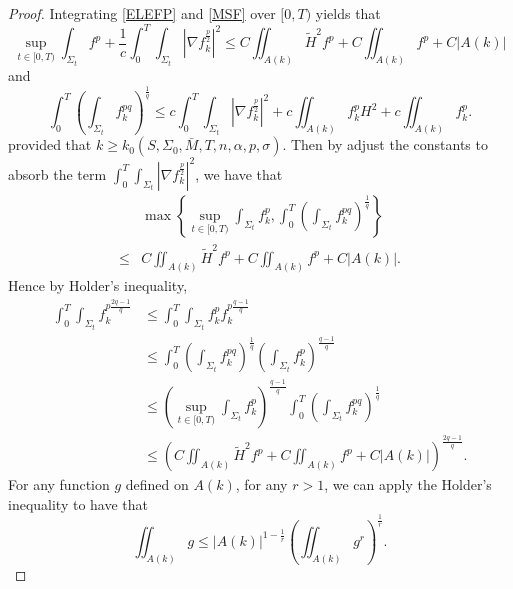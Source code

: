 \begin{proof}
    Integrating \autoref{ELEFP} and \autoref{MSF} over $[0,T)$ yields that 
    \begin{equation*}
        \sup _{t \in [0,T)} \int_{\Sigma_t} f^p + \frac{1}{c} \int_{0}^{T}\int_{\Sigma_t} \left| \nabla f_{k}^{\frac{p}{2}}  \right| ^2 \leq C \iint_{A(k)}^{} \tilde{H}^2 f^p +C \iint_{A(k)}^{}f^p + C \left| A(k) \right| 
    \end{equation*}
    and
    \begin{equation*}
        \int_{0}^{T} \left(\int_{\Sigma_t} f_{k}^{pq} \right) ^{\frac{1}{q}} \leq c \int_{0}^{T}\int_{\Sigma_t} \left| \nabla f_{k}^{\frac{p}{2}} \right| ^2 + c \iint_{A(k)} f_{k}^{p} H^2 + c \iint_{A(k)} f_{k}^{p}.
    \end{equation*}
    provided that $k \geq k_0(S,\Sigma _0,\bar{M},T,n,\alpha ,p,\sigma ).$ 
    Then by adjust the constants to absorb the term $\int_{0}^{T}\int_{\Sigma_t} \left| \nabla f_{k}^{\frac{p}{2}} \right| ^2$, we have that
    \begin{equation*}
    \begin{split}
        &\max \left\{ \sup _{t \in [0,T)} \int_{\Sigma_t} f_{k}^{p}, \int_{0}^{T} \left(\int_{\Sigma_t} f_{k}^{pq} \right) ^{\frac{1}{q}}  \right\} \\
        \leq &C \iint_{A(k)}^{} \tilde{H}^2 f^p +C \iint_{A(k)}^{}f^p + C \left| A(k) \right|. 
    \end{split}
    \end{equation*} 
    Hence by Holder's inequality,
    \begin{equation} \label{SIE}
    \begin{split}
        \int_{0}^{T} \int_{\Sigma_t} f_{k}^{p \frac{2q-1}{q}}  
    &\leq  \int_{0}^{T} \int_{\Sigma_t} f_{k}^{p} f_{k}^{p \frac{q-1}{q}}  \\
    & \leq \int_{0}^{T} \left( \int_{\Sigma_t} f_{k}^{pq}  \right) ^{\frac{1}{q}} \left( \int_{\Sigma_t} f_{k}^{p}  \right) ^{\frac{q-1}{q}}\\
    & \leq \left( \sup _{t \in [0,T)} \int_{\Sigma_t} f_{k}^{p} \right) ^{\frac{q-1}{q}}  \int_{0}^{T} \left(\int_{\Sigma_t} f_{k}^{pq} \right) ^{\frac{1}{q}} \\
    & \leq \left( C \iint_{A(k)}^{} \tilde{H}^2 f^p +C \iint_{A(k)}^{}f^p + C \left| A(k) \right| \right) ^{\frac{2q-1}{q}}.
    \end{split}
    \end{equation}
    For any function $g$ defined on $A(k)$, for any $r>1$, we can apply the Holder's inequality to have that \[\iint_{A(k)}^{}g \leq \left| A(k) \right| ^{1-\frac{1}{r}}\left( \iint_{A(k)}^{} g^r \right) ^{\frac{1}{r}}.\]

\end{proof}
